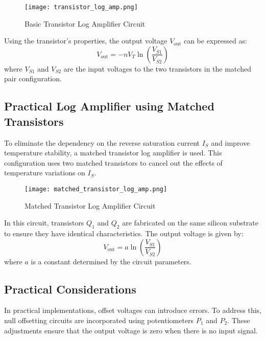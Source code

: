 \begin{figure}[h]
    \centering
    \texttt{[image: transistor\_log\_amp.png]}
    \caption{Basic Transistor Log Amplifier Circuit}
    \label{fig:transistor_log_amp}
\end{figure}

Using the transistor's properties, the output voltage \(V_{\text{out}}\) can be expressed as:
\begin{equation}
V_{\text{out}} = -nV_T \ln\left(\frac{V_{S1}}{V_{S2}}\right)
\label{eq:transistor_log_amp}
\end{equation}
where \(V_{S1}\) and \(V_{S2}\) are the input voltages to the two transistors in the matched pair configuration.

\subsection{Practical Log Amplifier using Matched Transistors}
To eliminate the dependency on the reverse saturation current \(I_S\) and improve temperature stability, a matched transistor log amplifier is used. This configuration uses two matched transistors to cancel out the effects of temperature variations on \(I_S\).

\begin{figure}[h]
    \centering
    \texttt{[image: matched\_transistor\_log\_amp.png]}
    \caption{Matched Transistor Log Amplifier Circuit}
    \label{fig:matched_transistor_log_amp}
\end{figure}

In this circuit, transistors \(Q_1\) and \(Q_2\) are fabricated on the same silicon substrate to ensure they have identical characteristics. The output voltage is given by:
\begin{equation}
V_{\text{out}} = a \ln\left(\frac{V_{S1}}{V_{S2}}\right)
\label{eq:matched_log_amp}
\end{equation}
where \(a\) is a constant determined by the circuit parameters.

\subsection{Practical Considerations}
In practical implementations, offset voltages can introduce errors. To address this, null offsetting circuits are incorporated using potentiometers \(P_1\) and \(P_2\). These adjustments ensure that the output voltage is zero when there is no input signal.

